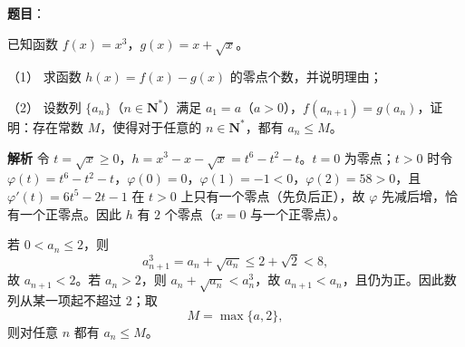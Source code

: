 \begin{answer}

\textbf{题目}：

已知函数 $f(x)=x^3$，$g(x)=x+\sqrt x$。

（1） 求函数 $h(x)=f(x)-g(x)$ 的零点个数，并说明理由；

（2） 设数列 $\{a_n\}$（$n\in\mathbf N^*$）满足 $a_1=a$（$a>0$），$f(a_{n+1})=g(a_n)$，证明：存在常数 $M$，使得对于任意的 $n\in\mathbf N^*$，都有 $a_n\leqslant M$。

\textbf{解析}
令 $t=\sqrt x\geqslant0$，$h=x^3-x-\sqrt x=t^6-t^2-t$。$t=0$ 为零点；$t>0$ 时令 $\varphi(t)=t^6-t^2-t$，$\varphi(0)=0$，$\varphi(1)=-1<0$，$\varphi(2)=58>0$，且 $\varphi'(t)=6t^5-2t-1$ 在 $t>0$ 上只有一个零点（先负后正），故 $\varphi$ 先减后增，恰有一个正零点。因此 $h$ 有 $2$ 个零点（$x=0$ 与一个正零点）。

若 $0<a_n\leqslant2$，则
\nopagebreak[4]
\[a_{n+1}^3=a_n+\sqrt{a_n}\leqslant2+\sqrt2<8,\]
故 $a_{n+1}<2$。若 $a_n>2$，则 $a_n+\sqrt{a_n}<a_n^3$，故 $a_{n+1}<a_n$，且仍为正。因此数列从某一项起不超过 $2$；取
\nopagebreak[4]
\[M=\max\{a,2\},\]
则对任意 $n$ 都有 $a_n\leqslant M$。



\end{answer}
